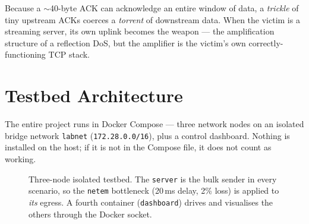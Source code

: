 \documentclass[11pt,a4paper]{article}
\begin{document}
Because a $\sim$40-byte ACK can acknowledge an entire window of data, a \emph{trickle} of
tiny upstream ACKs coerces a \emph{torrent} of downstream data. When the victim is a
streaming server, its own uplink becomes the weapon --- the amplification structure of a
reflection DoS, but the amplifier is the victim's own correctly-functioning TCP stack.

\section{Testbed Architecture}
\label{sec:testbed}

The entire project runs in Docker Compose --- three network nodes on an isolated bridge
network \texttt{labnet} (\texttt{172.28.0.0/16}), plus a control dashboard. Nothing is
installed on the host; if it is not in the Compose file, it does not count as working.

\begin{figure}[h]
\centering
{}
\caption{Three-node isolated testbed. The \texttt{server} is the bulk sender in every
scenario, so the \texttt{netem} bottleneck (20\,ms delay, 2\% loss) is applied to
\emph{its} egress. A fourth container (\texttt{dashboard}) drives and visualises the
others through the Docker socket.}
\label{fig:topology}
\end{figure}
\end{document}
